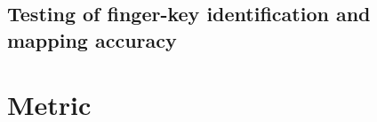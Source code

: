 \documentclass{report}
\begin{document}
\subsection{Testing of finger-key identification and mapping accuracy}
\section{Metric}

\newpage
\printbibliography[heading=bibintoc,title={References}]{}
\end{document}
